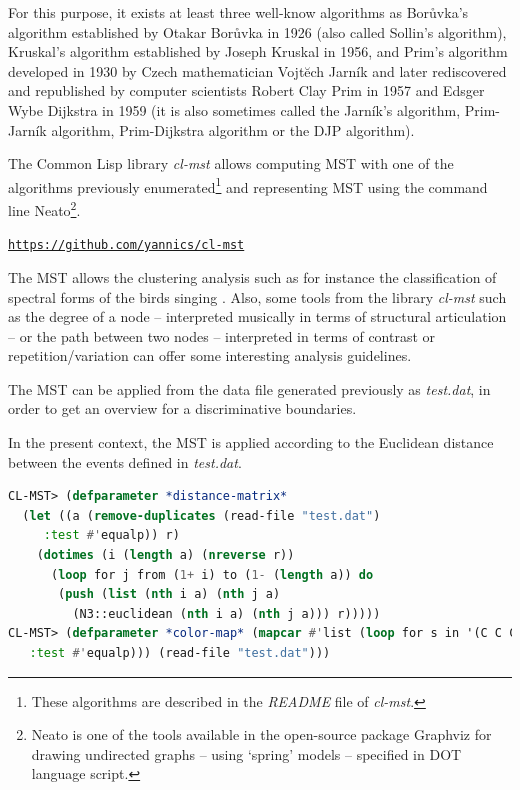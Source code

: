 For this purpose, it exists at least three well-know algorithms as Bor\r{u}vka's algorithm established by Otakar Bor\r{u}vka in 1926 (also called Sollin's algorithm), Kruskal's algorithm established by Joseph Kruskal in 1956, and Prim's algorithm developed in 1930 by Czech mathematician Vojt\u{e}ch Jarn\'ik and later rediscovered and republished by computer scientists Robert Clay Prim in 1957 and Edsger Wybe Dijkstra in 1959 (it is also sometimes called the Jarn\'ik's algorithm, Prim-Jarn\'ik algorithm, Prim-Dijkstra algorithm or the DJP algorithm).

\bigskip

The Common Lisp library \textsl{cl-mst} allows computing MST with one of the algorithms previously enumerated\footnote{These algorithms are described in the \textsl{README} file of \textsl{cl-mst}.} and  representing MST using the command line Neato\footnote{Neato is one of the tools available in the open-source package Graphviz for drawing undirected graphs -- 	 using `spring' models \citep{kek} -- specified in DOT language script.\label{neato}}.

\href{https://github.com/yannics/cl-mst}{\texttt{\small https://github.com/yannics/cl-mst}}

\bigskip

The MST allows the clustering analysis such as  for instance the classification of spectral forms of the birds singing \citep{deec}. Also, some tools from the library \textsl{cl-mst} such as the degree of a node -- interpreted musically in terms of structural articulation -- or the path between two nodes -- interpreted in terms of contrast or repetition/variation can offer some interesting analysis guidelines.

\bigskip

The MST can be applied from the data file generated previously as \textsl{test.dat}, in order to get an overview for a discriminative boundaries.

In the present context, the MST is applied according to the Euclidean distance between the events defined in \textsl{test.dat}. 

\smallskip

\begin{lstlisting}[language=Lisp]
CL-MST> (defparameter *distance-matrix*
  (let ((a (remove-duplicates (read-file "test.dat") 
     :test #'equalp)) r)
    (dotimes (i (length a) (nreverse r))
      (loop for j from (1+ i) to (1- (length a)) do
	   (push (list (nth i a) (nth j a)
		 (N3::euclidean (nth i a) (nth j a))) r)))))
CL-MST> (defparameter *color-map* (mapcar #'list (loop for s in '(C C C A A C C D D A C B C A A E C D D A C A A B B B B B B E B B B D A C A A E B B B B B E E B B B B A C D E A A E A A C B B B B E A A A A B B A D A B C C A C E C D D A C D B A E C D A A A B B E A A E B A D A E D E A A E A D D C C B E A B B C E B D A B D A A E B A A A B B E A A B C D B B) collect (cadr (assoc s '((A coral) (B chartreuse4) (C dodgerblue2) (D darkorchid1) (E sienna)) 
   :test #'equalp))) (read-file "test.dat")))	     
\end{lstlisting}

